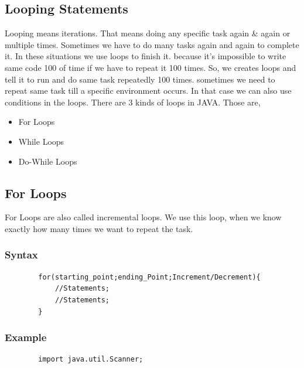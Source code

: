 \documentclass[openany]{book}  %
\begin{document}
\begin{flushleft}
    \section{Looping Statements}
    Looping means iterations. That means doing any specific task again \& again or multiple times. Sometimes we have to do many tasks again and again to complete it. In these situations
    we use loops to finish it. because it's impossible to write same code 100 of time if we have to repeat it 100 times. So, we creates loops and tell it to run and do same task repeatedly 100 times.
    sometimes we need to repeat same task till a specific environment occurs. In that case we can also use conditions in the loops. There are 3 kinds of loops in JAVA. Those are,
    \begin{itemize}
        \item For Loops
        \item While Loops
        \item Do-While Loops
    \end{itemize}
    \subsection{For Loops}
    For Loops are also called incremental loops. We use this loop, when we know exactly how many times we want to repeat the task.
    \subsubsection{Syntax}
    \begin{center}
        \begin{verbatim}
        for(starting_point;ending_Point;Increment/Decrement){
            //Statements;
            //Statements;
        }
    \end{verbatim}
    \end{center}
    \subsubsection{Example}
    \begin{center}
        \footnotesize
        \begin{verbatim}
        import java.util.Scanner;


\end{verbatim}
\end{center}
\end{flushleft}
\end{document}

